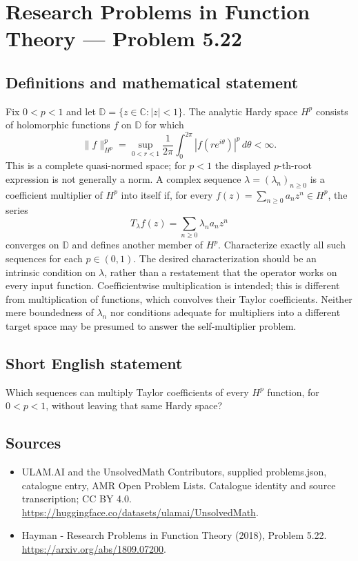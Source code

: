 \documentclass[11pt,a4paper]{article}
\begin{document}
\section*{Research Problems in Function Theory — Problem 5.22}\label{statement}

\subsection{Definitions and mathematical statement}
Fix $0<p<1$ and let $\mathbb D=\{z\in\mathbb C:|z|<1\}$. The analytic Hardy space $H^p$ consists of holomorphic functions $f$ on $\mathbb D$ for which
\[
\|f\|_{H^p}^p=\sup_{0<r<1}\frac1{2\pi}
\int_0^{2\pi}|f(re^{i\theta})|^p\,d\theta<\infty.
\]
This is a complete quasi-normed space; for $p<1$ the displayed $p$-th-root expression is not generally a norm.
A complex sequence $\lambda=(\lambda_n)_{n\ge0}$ is a coefficient multiplier of $H^p$ into itself if, for every $f(z)=\sum_{n\ge0}a_nz^n\in H^p$, the series
\[
T_\lambda f(z)=\sum_{n\ge0}\lambda_na_nz^n
\]
converges on $\mathbb D$ and defines another member of $H^p$. Characterize exactly all such sequences for each $p\in(0,1)$.
The desired characterization should be an intrinsic condition on $\lambda$, rather than a restatement that the operator works on every input function. Coefficientwise multiplication is intended; this is different from multiplication of functions, which convolves their Taylor coefficients. Neither mere boundedness of $\lambda_n$ nor conditions adequate for multipliers into a different target space may be presumed to answer the self-multiplier problem.
\subsection{Short English statement}
Which sequences can multiply Taylor coefficients of every $H^p$ function, for $0<p<1$, without leaving that same Hardy space?
\subsection{Sources}
\begin{itemize}
\item[S1] ULAM.AI and the UnsolvedMath Contributors, supplied problems.json, catalogue entry, AMR Open Problem Lists. Catalogue identity and source transcription; CC BY 4.0.
\url{https://huggingface.co/datasets/ulamai/UnsolvedMath}.
\item[S2] Hayman - Research Problems in Function Theory (2018), Problem 5.22. 
\url{https://arxiv.org/abs/1809.07200}.
\end{itemize}
\end{document}
